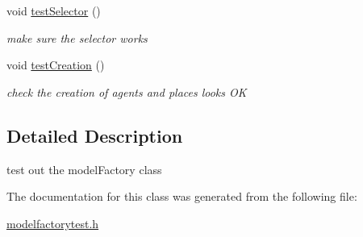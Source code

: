 \begin{DoxyCompactItemize}
\mbox{\label{classmodelFactoryTest_ae0327f9c7d653c9a4864122a3f088118}} 
void \mbox{\hyperlink{classmodelFactoryTest_ae0327f9c7d653c9a4864122a3f088118}{test\+Selector}} ()
\begin{DoxyCompactList}\small\item\em make sure the selector works \end{DoxyCompactList}\item 
\mbox{\label{classmodelFactoryTest_a1bea8789a99ca88af5942eaf6c3fa687}} 
void \mbox{\hyperlink{classmodelFactoryTest_a1bea8789a99ca88af5942eaf6c3fa687}{test\+Creation}} ()
\begin{DoxyCompactList}\small\item\em check the creation of agents and places looks OK \end{DoxyCompactList}\end{DoxyCompactItemize}


\subsection{Detailed Description}
test out the model\+Factory class 

The documentation for this class was generated from the following file\+:\begin{DoxyCompactItemize}
\item 
\mbox{\hyperlink{modelfactorytest_8h}{modelfactorytest.\+h}}\end{DoxyCompactItemize}
